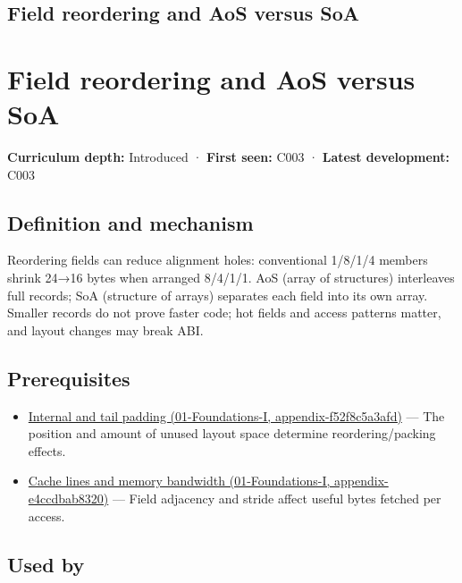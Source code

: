 \hypertarget{appendix-5522ad176ca0}{}
\section*{Field reordering and AoS versus SoA}
\chapter{Field reordering and AoS versus SoA}\label{appendix-5522ad176ca0-field-reordering-and-aos-versus-soa}

\textbf{Curriculum depth:} Introduced · \textbf{First seen:} C003 · \textbf{Latest development:} C003

\section{Definition and mechanism}\label{appendix-5522ad176ca0-definition-and-mechanism}

Reordering fields can reduce alignment holes: conventional 1/8/1/4 members shrink 24→16 bytes when arranged 8/4/1/1. AoS (array of structures) interleaves full records; SoA (structure of arrays) separates each field into its own array. Smaller records do not prove faster code; hot fields and access patterns matter, and layout changes may break ABI.

\section{Prerequisites}\label{appendix-5522ad176ca0-prerequisites}

\begin{itemize}
\tightlist
\item
  \href{../01-Foundations-I/main.pdf\#nameddest=appendix-f52f8c5a3afd}{Internal and tail padding (01-Foundations-I, appendix-f52f8c5a3afd)} --- The position and amount of unused layout space determine reordering/packing effects.
\item
  \href{../01-Foundations-I/main.pdf\#nameddest=appendix-e4ccdbab8320}{Cache lines and memory bandwidth (01-Foundations-I, appendix-e4ccdbab8320)} --- Field adjacency and stride affect useful bytes fetched per access.
\end{itemize}

\section{Used by}\label{appendix-5522ad176ca0-used-by}

